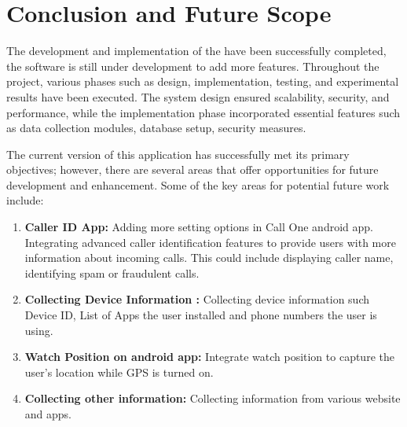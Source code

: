 \chapter{Conclusion and Future Scope}

The development and implementation of the {\myprojectname} have been successfully completed, the software is still under development to add more features. Throughout the project, various phases such as design, implementation, testing, and experimental results have been executed. The system design ensured scalability, security, and performance, while the implementation phase incorporated essential features such as data collection modules, database setup, security measures.

The current version of this application has successfully met its primary objectives; however, there are several areas that offer opportunities for future development and enhancement. Some of the key areas for potential future work include:

\begin{enumerate}[label=\roman*.]

    \item \textbf{Caller ID App:} Adding more setting options in Call One android app. Integrating advanced caller identification features to provide users with more information about incoming calls. This could include displaying caller name, identifying spam or fraudulent calls.
    \item \textbf{Collecting Device Information :} Collecting device information such Device ID, List of Apps the user installed and phone numbers the user is using.
    \item \textbf{Watch Position on android app:} Integrate watch position to capture the user's location while GPS is turned on.
    \item \textbf{Collecting  other information:} Collecting information from various website and apps.

\end{enumerate}

